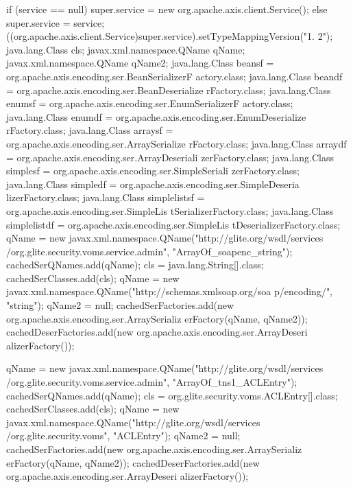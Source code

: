 \begin{DoxyCode}
                                                                                 
                         {
        if (service == null) {
            super.service = new org.apache.axis.client.Service();
        } else {
            super.service = service;
        }
        ((org.apache.axis.client.Service)super.service).setTypeMappingVersion("1.
      2");
            java.lang.Class cls;
            javax.xml.namespace.QName qName;
            javax.xml.namespace.QName qName2;
            java.lang.Class beansf = org.apache.axis.encoding.ser.BeanSerializerF
      actory.class;
            java.lang.Class beandf = org.apache.axis.encoding.ser.BeanDeserialize
      rFactory.class;
            java.lang.Class enumsf = org.apache.axis.encoding.ser.EnumSerializerF
      actory.class;
            java.lang.Class enumdf = org.apache.axis.encoding.ser.EnumDeserialize
      rFactory.class;
            java.lang.Class arraysf = org.apache.axis.encoding.ser.ArraySerialize
      rFactory.class;
            java.lang.Class arraydf = org.apache.axis.encoding.ser.ArrayDeseriali
      zerFactory.class;
            java.lang.Class simplesf = org.apache.axis.encoding.ser.SimpleSeriali
      zerFactory.class;
            java.lang.Class simpledf = org.apache.axis.encoding.ser.SimpleDeseria
      lizerFactory.class;
            java.lang.Class simplelistsf = org.apache.axis.encoding.ser.SimpleLis
      tSerializerFactory.class;
            java.lang.Class simplelistdf = org.apache.axis.encoding.ser.SimpleLis
      tDeserializerFactory.class;
            qName = new javax.xml.namespace.QName("http://glite.org/wsdl/services
      /org.glite.security.voms.service.admin", "ArrayOf_soapenc_string");
            cachedSerQNames.add(qName);
            cls = java.lang.String[].class;
            cachedSerClasses.add(cls);
            qName = new javax.xml.namespace.QName("http://schemas.xmlsoap.org/soa
      p/encoding/", "string");
            qName2 = null;
            cachedSerFactories.add(new org.apache.axis.encoding.ser.ArraySerializ
      erFactory(qName, qName2));
            cachedDeserFactories.add(new org.apache.axis.encoding.ser.ArrayDeseri
      alizerFactory());

            qName = new javax.xml.namespace.QName("http://glite.org/wsdl/services
      /org.glite.security.voms.service.admin", "ArrayOf_tns1_ACLEntry");
            cachedSerQNames.add(qName);
            cls = org.glite.security.voms.ACLEntry[].class;
            cachedSerClasses.add(cls);
            qName = new javax.xml.namespace.QName("http://glite.org/wsdl/services
      /org.glite.security.voms", "ACLEntry");
            qName2 = null;
            cachedSerFactories.add(new org.apache.axis.encoding.ser.ArraySerializ
      erFactory(qName, qName2));
            cachedDeserFactories.add(new org.apache.axis.encoding.ser.ArrayDeseri
      alizerFactory());

}
\end{DoxyCode}
